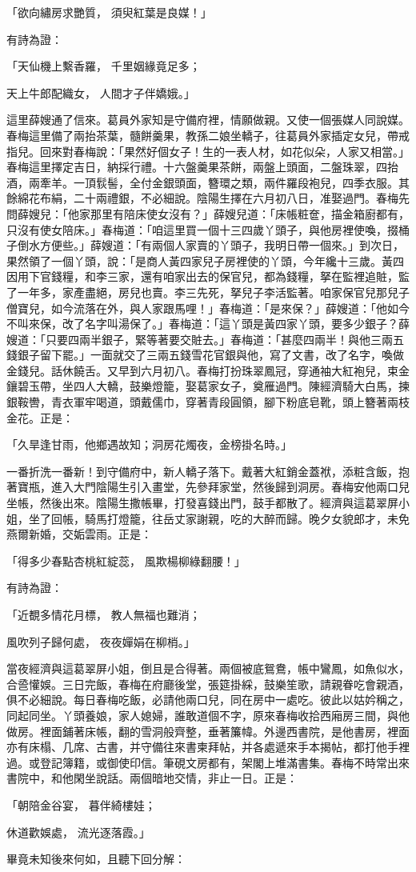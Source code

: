 「欲向繡房求艷質，  須臾紅葉是良媒！」

有詩為證：

「天仙機上繫香羅，  千里姻緣竟足多；

天上牛郎配織女，  人間才子伴嬌娥。」

這里薛嫂通了信來。葛員外家知是守備府裡，情願做親。又使一個張媒人同說媒。春梅這里備了兩抬茶葉，髓餅羹果，教孫二娘坐轎子，往葛員外家插定女兒，帶戒指兒。回來對春梅說：「果然好個女子！生的一表人材，如花似朵，人家又相當。」春梅這里擇定吉日，納採行禮。十六盤羹果茶餅，兩盤上頭面，二盤珠翠，四抬酒，兩牽羊。一頂䯼髻，全付金銀頭面，簪環之類，兩件羅段袍兒，四季衣服。其餘綿花布絹，二十兩禮銀，不必細說。陰陽生擇在六月初八日，准娶過門。春梅先問薛嫂兒：「他家那里有陪床使女沒有？」薛嫂兒道：「床帳粧奩，描金箱廚都有，只沒有使女陪床。」春梅道：「咱這里買一個十三四歲丫頭子，與他房裡使喚，掇桶子倒水方便些。」薛嫂道：「有兩個人家賣的丫頭子，我明日帶一個來。」到次日，果然領了一個丫頭，說：「是商人黃四家兒子房裡使的丫頭，今年纔十三歲。黃四因用下官錢糧，和李三家，還有咱家出去的保官兒，都為錢糧，拏在監裡追賍，監了一年多，家產盡絕，房兒也賣。李三先死，拏兒子李活監著。咱家保官兒那兒子僧寶兒，如今流落在外，與人家跟馬哩！」春梅道：「是來保？」薛嫂道：「他如今不叫來保，改了名字叫湯保了。」春梅道：「這丫頭是黃四家丫頭，要多少銀子？薛嫂道：「只要四兩半銀子，緊等著要交賍去。」春梅道：「甚麼四兩半！與他三兩五錢銀子留下罷。」一面就交了三兩五錢雪花官銀與他，寫了文書，改了名字，喚做金錢兒。話休饒舌。又早到六月初八。春梅打扮珠翠鳳冠，穿通袖大紅袍兒，束金鑲碧玉帶，坐四人大轎，鼓樂燈籠，娶葛家女子，奠雁過門。陳經濟騎大白馬，揀銀鞍轡，青衣軍牢喝道，頭戴儒巾，穿著青段圓領，腳下粉底皂靴，頭上簪著兩枝金花。正是：

「久旱逢甘雨，他鄉遇故知；洞房花燭夜，金榜掛名時。」

一番折洗一番新！到守備府中，新人轎子落下。戴著大紅銷金蓋袱，添粧含飯，抱著寶瓶，進入大門陰陽生引入畫堂，先參拜家堂，然後歸到洞房。春梅安他兩口兒坐帳，然後出來。陰陽生撒帳畢，打發喜錢出門，鼓手都散了。經濟與這葛翠屏小姐，坐了回帳，騎馬打燈籠，往岳丈家謝親，吃的大醉而歸。晚夕女貌郎才，未免燕爾新婚，交姤雲雨。正是：

「得多少春點杏桃紅綻蕊，  風欺楊柳綠翻腰！」

有詩為證：

「近覩多情花月標，  教人無福也難消；

風吹列子歸何處，  夜夜嬋娟在柳梢。」

當夜經濟與這葛翠屏小姐，倒且是合得著。兩個被底鴛鴦，帳中鸞鳳，如魚似水，合巹懽娛。三日完飯，春梅在府廳後堂，張筵掛綵，鼓樂笙歌，請親眷吃會親酒，俱不必細說。每日春梅吃飯，必請他兩口兒，同在房中一處吃。彼此以姑妗稱之，同起同坐。丫頭養娘，家人媳婦，誰敢道個不字，原來春梅收拾西廂房三間，與他做房。裡面鋪著床帳，翻的雪洞般齊整，垂著簾幃。外邊西書院，是他書房，裡面亦有床榻、几席、古書，并守備往來書柬拜帖，并各處遞來手本揭帖，都打他手裡過。或登記簿籍，或御使印信。筆硯文房都有，架閣上堆滿書集。春梅不時常出來書院中，和他閑坐說話。兩個暗地交情，非止一日。正是：

「朝陪金谷宴，  暮伴綺樓娃；

休道歡娛處，  流光逐落霞。」

畢竟未知後來何如，且聽下回分解：

